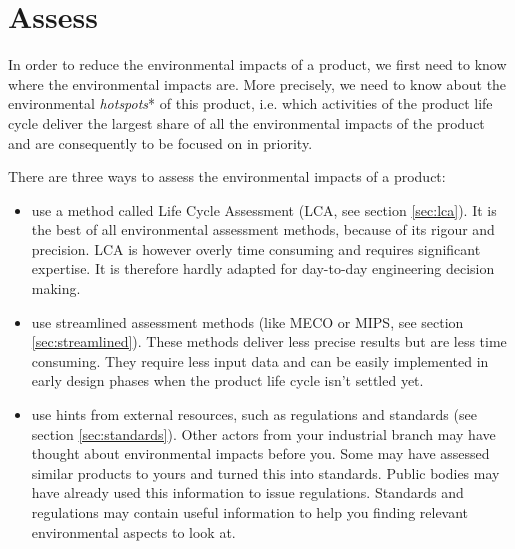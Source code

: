 \documentclass{article}
\newcounter{exercise}
\begin{document}
%

\section{Assess}
\label{sec:assess}

In order to reduce the environmental impacts of a product, we first need to know where the environmental impacts are. More precisely, we need to know about the environmental \emph{hotspots}* of this product, i.e. which activities of the product life cycle deliver the largest share of all the environmental impacts of the product and are consequently to be focused on in priority. 

There are three ways to assess the environmental impacts of a product: 
\begin{itemize}
  \item use a method called Life Cycle Assessment (LCA, see section \ref{sec:lca}). It is the best of all environmental assessment methods, because of its rigour and precision. LCA is however overly time consuming and requires significant expertise. It is therefore hardly adapted for day-to-day engineering decision making.
	\item use streamlined assessment methods (like MECO or MIPS, see section \ref{sec:streamlined}). These methods deliver less precise results but are less time consuming. They require less input data and can be easily implemented in early design phases when the product life cycle isn't settled yet. 
	\item use hints from external resources, such as regulations and standards (see section \ref{sec:standards}). Other actors from your industrial branch may have thought about environmental impacts before you. Some may have assessed similar products to yours and turned this into standards. Public bodies may have already used this information to issue regulations. Standards and regulations may contain useful information to help you finding relevant environmental aspects to look at. 
\end{itemize}
\end{document}
